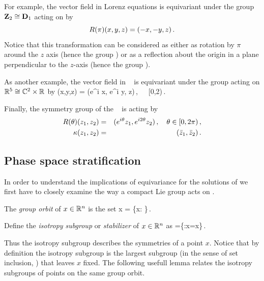 For example, the vector field in Lorenz equations   is equivariant under the group
$\mathbf{Z}_2\cong\mathbf{D}_1$ acting on  by
\[
	R(\pi)(x,y,z) = (-x,-y,z)\,.
\]
Notice that this transformation can be considered as either as rotation by $\pi$ around the $z$ axis (hence the
group ) or as a reflection about the origin in a plane perpendicular to the $z$-axis (hence the group ).

As another example, the vector field in \CLe\  is equivariant under the group  acting on $\mathbb{R}^{5}\cong \mathbb{C}^{2}\times \mathbb{R}^{}$
by
\beq
 \Rot{\theta} (x,y,z) = (e^{i\theta} x, e^{i\theta} y, z)\,,\ \ \  \theta\in[0,2\pi)\,.
 \label{eq:RotCLe}
\eeq

Finally, the symmetry group of the \AGHe~ is  acting by
\begin{eqnarray*}
  R(\theta)(z_1,z_2) &=& (e^{i\theta} z_1, e^{i 2\theta} z_2)\,,\ \ \  \theta\in[0,2\pi)\,,\\
  \kappa(z_1,z_2) &=& (\bar{z}_1,\bar{z}_2)\,.
\end{eqnarray*}


\subsection{Phase space stratification}

In order to understand the implications of equivariance for the solutions
of  we first have to closely examine the way a compact
Lie group acts on .

 The \emph{group orbit} of $x\in\mathbb{R}^{n}$ is the set
\beq
	\Gamma x = \{\gamma x: \gamma\in\Gamma\}\,.
\eeq

\begin{definition}
\label{def:stab}
 Define the \emph{isotropy subgroup} or \emph{stabilizer} of $x\in\mathbb{R}^{n}$ as
\beq
	=\{\gamma\in\Gamma:\gamma x=x\}\,.
\eeq
\end{definition}
Thus the isotropy subgroup describes the symmetries of a point $x$. Notice that by
definition  the isotropy subgroup is the largest subgroup (in the
sense of set inclusion, \cf {}) that leaves $x$ fixed. The following usefull lemma
relates the isotropy subgroups of points on the same group orbit.

